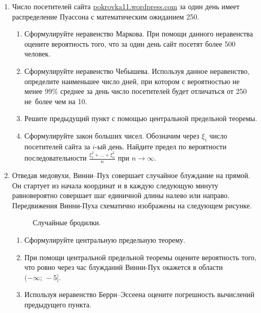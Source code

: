 \begin{enumerate}
\item Число посетителей сайта \url{pokrovka11.wordpress.com} за один день имеет
распределение Пуассона с математическим ожиданием 250.
\begin{enumerate}
  \item Сформулируйте неравенство Маркова. При помощи данного неравенства оцените
  вероятность того, что за один день сайт посетят более 500 человек.
  \item Сформулируйте неравенство Чебышева. Используя данное неравенство, определите
  наименьшее число дней, при котором с вероятностью не менее 99\% среднее за день
  число посетителей будет отличаться от 250 не~более чем на 10.
  \item Решите предыдущий пункт с помощью центральной предельной теоремы.
  \item Сформулируйте закон больших чисел. Обозначим через $\xi_i$ число посетителей
  сайта за $i$-ый день. Найдите предел по вероятности последовательности
  $\frac{\xi_1^2 + \ldots + \xi_n^2}{n}$ при $n \rightarrow \infty$.
\end{enumerate}

\item Отведав медовухи, Винни–Пух совершает случайное блуждание на прямой. Он
стартует из начала координат и в каждую следующую минуту равновероятно совершает
шаг единичной длины налево или направо. Передвижения Винни-Пуха схематично
изображены на следующем рисунке.
\begin{figure}[h]
    \noindent{}
    \caption{Случайные бродилки.}
    \label{wun762hkej}
\end{figure}
\begin{enumerate}
  \item Сформулируйте центральную предельную теорему.
  \item При помощи центральной предельной теоремы оцените вероятность того, что
  ровно через час блужданий Винни-Пух окажется в области $(-\infty; \, -5]$.
  \item Используя неравенство Берри–Эссеена оцените погрешность вычислений предыдущего
  пункта.
\end{enumerate}


\end{enumerate}
